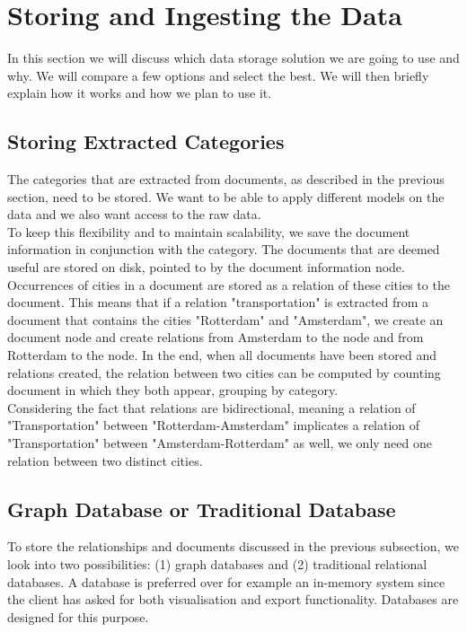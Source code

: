 \section{Storing and Ingesting the Data} \label{sec:storing-design}
In this section we will discuss which data storage solution we are going to use and why. We will compare a few options and select the best. We will then briefly explain how it works and how we plan to use it.

\subsection{Storing Extracted Categories}
The categories that are extracted from documents, as described in the previous section, need to be stored. We want to be able to apply different models on the data and we also want access to the raw data. \\
To keep this flexibility and to maintain scalability, we save the document information in conjunction with the category. The documents that are deemed useful are stored on disk, pointed to by the document information node. Occurrences of cities in a document are stored as a relation of these cities to the document. This means that if a relation "transportation" is extracted from a document that contains the cities "Rotterdam" and "Amsterdam", we create an document node and create relations from Amsterdam to the node and from Rotterdam to the node. In the end, when all documents have been stored and relations created, the relation between two cities can be computed by counting document in which they both appear, grouping by category. \\
Considering the fact that relations are bidirectional, meaning a relation of "Transportation" between "Rotterdam-Amsterdam" implicates a relation of "Transportation" between "Amsterdam-Rotterdam" as well, we only need one relation between two distinct cities.

\subsection{Graph Database or Traditional Database}
To store the relationships and documents discussed in the previous subsection, we look into two possibilities: (1) graph databases and (2) traditional relational databases. A database is preferred over for example an in-memory system since the client has asked for both visualisation and export functionality. Databases are designed for this purpose.


